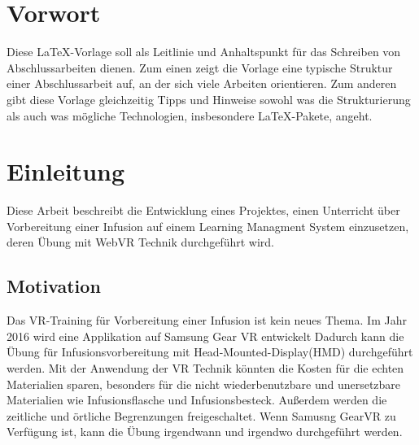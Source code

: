 \chapter*{Vorwort}

Diese \LaTeX-Vorlage soll als Leitlinie und Anhaltspunkt für das Schreiben von Abschlussarbeiten dienen. Zum einen zeigt die Vorlage eine typische Struktur einer Abschlussarbeit auf, an der sich viele Arbeiten orientieren. Zum anderen gibt diese Vorlage gleichzeitig Tipps und Hinweise sowohl was die Strukturierung als auch was mögliche Technologien, insbesondere \LaTeX-Pakete, angeht.

\chapter{Einleitung}

Diese Arbeit beschreibt die Entwicklung eines Projektes, einen Unterricht über Vorbereitung einer Infusion auf einem Learning Managment System einzusetzen, deren Übung mit WebVR Technik durchgeführt wird.

\section{Motivation}

Das VR-Training für Vorbereitung einer Infusion ist kein neues Thema. Im Jahr 2016 wird eine Applikation auf Samsung Gear VR entwickelt\citep{26}
Dadurch kann die Übung für Infusionsvorbereitung mit Head-Mounted-Display(HMD) durchgeführt werden. Mit der Anwendung der VR Technik könnten die Kosten für die echten Materialien sparen, besonders für die nicht wiederbenutzbare und unersetzbare Materialien wie Infusionsflasche und Infusionsbesteck. Außerdem werden die zeitliche und örtliche Begrenzungen freigeschaltet. Wenn Samusng GearVR zu Verfügung ist, kann die Übung irgendwann und irgendwo durchgeführt werden.

